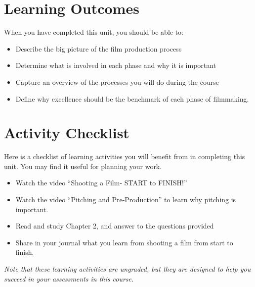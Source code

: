 \documentclass[
]{book}
\providecommand{\tightlist}{%
  \setlength{\itemsep}{0pt}\setlength{\parskip}{0pt}}
\begin{document}
\hypertarget{learning-outcomes-1}{%
\section*{Learning Outcomes}\label{learning-outcomes-1}}

When you have completed this unit, you should be able to:

\begin{itemize}
\tightlist
\item
  Describe the big picture of the film production process\\
\item
  Determine what is involved in each phase and why it is important\\
\item
  Capture an overview of the processes you will do during the course\\
\item
  Define why excellence should be the benchmark of each phase of filmmaking.
\end{itemize}

\hypertarget{activity-checklist-1}{%
\section*{Activity Checklist}\label{activity-checklist-1}}

\begin{reflect}
Here is a checklist of learning activities you will benefit from in completing this unit. You may find it useful for planning your work.

\begin{itemize}
\tightlist
\item
  Watch the video ``Shooting a Film- START to FINISH!''
\item
  Watch the video ``Pitching and Pre-Production'' to learn why pitching is important.
\item
  Read and study Chapter 2, and answer to the questions provided
\item
  Share in your journal what you learn from shooting a film from start to finish.
\end{itemize}

\emph{Note that these learning activities are ungraded, but they are designed to help you succeed in your assessments in this course.}
\end{reflect}
\end{document}
